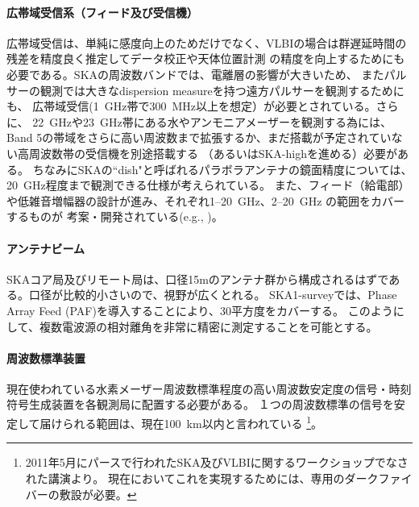 \paragraph{広帯域受信系（フィード及び受信機）}
広帯域受信は、単純に感度向上のためだけでなく、VLBIの場合は群遅延時間の残差を精度良く推定してデータ校正や天体位置計測
の精度を向上するためにも必要である。SKAの周波数バンドでは、電離層の影響が大きいため、
またパルサーの観測では大きなdispersion measureを持つ遠方パルサーを観測するためにも、
広帯域受信(1~GHz帯で300~MHz以上を想定）が必要とされている。さらに、
22~GHzや23~GHz帯にある水やアンモニアメーザーを観測する為には、
Band 5の帯域をさらに高い周波数まで拡張するか、まだ搭載が予定されていない高周波数帯の受信機を別途搭載する
（あるいはSKA-highを進める）必要がある。
ちなみにSKAの``dish"と呼ばれるパラボラアンテナの鏡面精度については、20~GHz程度まで観測できる仕様が考えられている。
また、フィード（給電部）や低雑音増幅器の設計が進み、それぞれ1--20~GHz、2--20~GHz の範囲をカバーするものが
考案・開発されている(e.g., \citealt{Dubrovka2010,Komiak2011,Ujihara2014})。

\paragraph{アンテナビーム}
SKAコア局及びリモート局は、口径15mのアンテナ群から構成されるはずである。口径が比較的小さいので、視野が広くとれる。
SKA1-surveyでは、Phase Array Feed (PAF)を導入することにより、30平方度をカバーする。
このようにして、複数電波源の相対離角を非常に精密に測定することを可能とする。

\paragraph{周波数標準装置}
現在使われている水素メーザー周波数標準程度の高い周波数安定度の信号・時刻符号生成装置を各観測局に配置する必要がある。
１つの周波数標準の信号を安定して届けられる範囲は、現在100~km以内と言われている
\footnote{2011年5月にパースで行われたSKA及びVLBIに関するワークショップでなされた講演より。
現在においてこれを実現するためには、専用のダークファイバーの敷設が必要。}。

